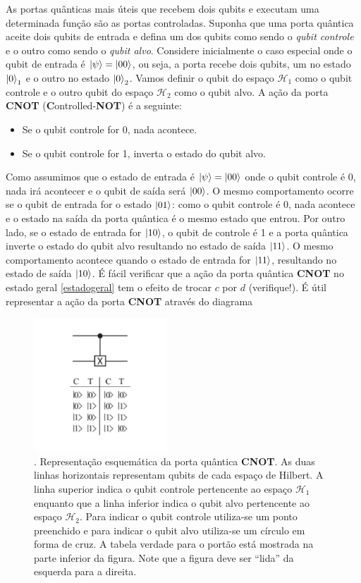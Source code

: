 \documentclass{article}
\begin{document}
As portas quânticas mais úteis que recebem dois qubits e executam uma determinada função são as portas controladas. Suponha que uma porta quântica aceite dois qubits de entrada e defina um dos qubits como sendo o \textit{qubit controle} e o outro como sendo o \textit{qubit alvo}. Considere inicialmente o caso especial onde o qubit de entrada é $\ket{\psi} = \ket{00}$, ou seja, a porta recebe dois qubits, um no estado $\ket{0}_1$ e o outro no estado $\ket{0}_2$. Vamos definir o qubit do espaço $\mathcal{H}_1$ como o qubit controle e o outro qubit do espaço $\mathcal{H}_2$ como o qubit alvo. A ação da porta \textbf{CNOT} (\textbf{C}ontrolled-\textbf{NOT}) é a seguinte:
\begin{itemize}
    \item Se o qubit controle for 0, nada acontece.
    \item Se o qubit controle for 1, inverta o estado do qubit alvo.
\end{itemize}
Como assumimos que o estado de entrada é $\ket{\psi} = \ket{00}$ onde o qubit controle é 0, nada irá acontecer e o qubit de saída será $\ket{00}$. O mesmo comportamento ocorre se o qubit de entrada for o estado $\ket{01}$: como o qubit controle é 0, nada acontece e o estado na saída da porta quântica é o mesmo estado que entrou. Por outro lado, se o estado de entrada for $\ket{10}$, o qubit de controle é 1 e a porta quântica inverte o estado do qubit alvo resultando no estado de saída $\ket{11}$. O mesmo comportamento acontece quando o estado de entrada for $\ket{11}$, resultando no estado de saída $\ket{10}$. É fácil verificar que a ação da porta quântica \textbf{CNOT} no estado geral \eqref{estadogeral} tem o efeito de trocar $c$ por $d$ (verifique!). É útil representar a ação da porta \textbf{CNOT} através do diagrama 
\begin{figure}[ht]
\centering
\includegraphics[width=5cm]{fig1novo.pdf}
\captionsetup{labelsep=none}
\caption{. Representação esquemática da porta quântica \textbf{CNOT}. As duas linhas horizontais representam qubits de cada espaço de Hilbert. A linha superior indica o qubit controle pertencente ao espaço $\mathcal{H}_1$ enquanto que a linha inferior indica o qubit alvo pertencente ao espaço $\mathcal{H}_2$. Para indicar o qubit controle utiliza-se um ponto preenchido e para indicar o qubit alvo utiliza-se um círculo em forma de cruz. A tabela verdade para o portão está mostrada na parte inferior da figura. Note que a figura deve ser ``lida'' da esquerda para a direita.}
\end{figure}
\end{document}
